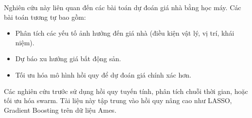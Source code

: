 Nghiên cứu này liên quan đến các bài toán dự đoán giá nhà bằng học máy. Các bài toán tương tự bao gồm:
\begin{itemize}
    \item Phân tích các yếu tố ảnh hưởng đến giá nhà (điều kiện vật lý, vị trí, khái niệm).
    \item Dự báo xu hướng giá bất động sản.
    \item Tối ưu hóa mô hình hồi quy để dự đoán giá chính xác hơn.
\end{itemize}
Các nghiên cứu trước sử dụng hồi quy tuyến tính, phân tích chuỗi thời gian, hoặc tối ưu hóa swarm. Tài liệu này tập trung vào hồi quy nâng cao như LASSO, Gradient Boosting trên dữ liệu Ames.